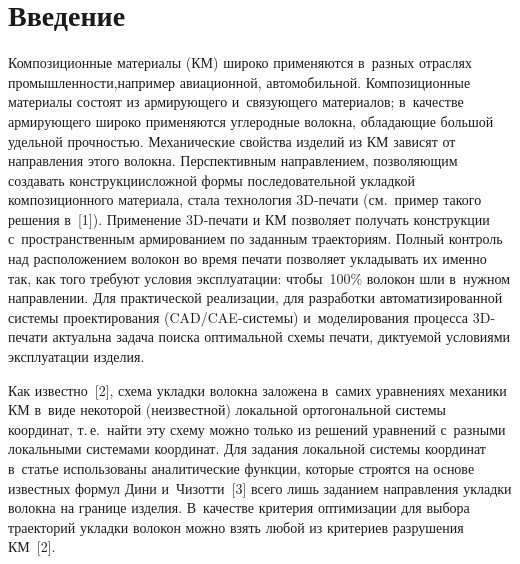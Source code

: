   



\thispagestyle{headings}

\begin{multicols}{2}

\label{st\stat}

\section{Введение}

  Композиционные материалы (КМ) широко применяются в~разных отраслях 
про\-мыш\-лен\-ности,\linebreak например авиационной, автомобильной. Композиционные материалы состоят из 
ар\-ми\-ру\-юще\-го и~свя\-зу\-юще\-го материалов; в~качестве ар\-ми\-ру\-юще\-го широко 
применяются углеродные волокна, \mbox{об\-ла\-да\-ющие} большой удельной проч\-ностью. 
Механические свойства изделий из КМ зависят от на\-прав\-ле\-ния этого волокна. 
Перспективным на\-прав\-ле\-нием, поз\-во\-ля\-ющим создавать конструкции\linebreak слож\-ной 
формы последовательной укладкой композиционного материала, стала технология  
3D-пе\-ча\-ти (см.\ пример такого решения в~[1]). Применение 3D-пе\-ча\-ти 
и КМ позволяет получать \mbox{конструкции} с~пространственным армированием по 
заданным траекториям. Пол\-ный контроль над расположением волокон во время 
печати позволяет укладывать их именно так, как того требуют условия 
эксплуатации: чтобы~100\% волокон шли в~нужном направлении. Для 
практической реализации, для разработки автоматизированной сис\-те\-мы 
проектирования (CAD/CAE-сис\-те\-мы) и~моделирования процесса 3D-пе\-ча\-ти 
актуальна задача поиска оптимальной схемы печати, дик\-ту\-емой условиями 
эксплуатации изделия.
  
  Как известно~[2], схема укладки волокна заложена в~самих уравнениях 
механики КМ в~виде некоторой (неизвестной) локальной ортогональной сис\-те\-мы 
координат, т.\,е.\ найти эту схему можно только из решений уравнений 
с~разными локальными системами координат. Для задания локальной сис\-те\-мы 
координат в~статье использованы аналитические функции, которые строятся на 
основе известных формул Дини и~Чизотти~[3] всего лишь заданием направления 
укладки волокна на границе изделия. В~качестве критерия оптимизации для 
выбора траекторий уклад\-ки волокон можно взять любой из критериев разрушения 
КМ~[2].
  

\end{multicols}
